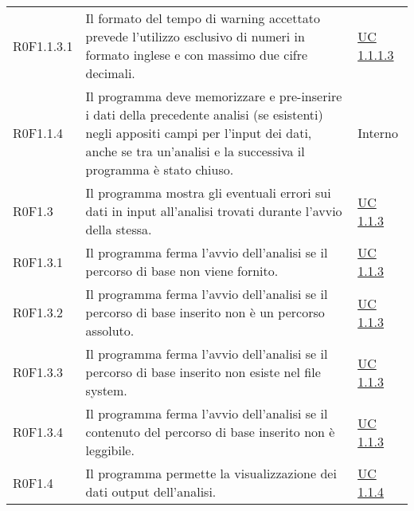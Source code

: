 \begin{center}
\begin{longtable}{p{4.2cm}!{\color{white}\vrule width 0.5mm}p{6cm}!{\color{white}\vrule width 0.5mm}p{2.5cm}!{\color{white}\vrule width 0.5mm}}
				\hspace{6mm}\hypertarget{R0F1.1.3.1}{R0F1.1.3.1}  & Il formato del tempo di warning accettato prevede l'utilizzo esclusivo di numeri in formato inglese e con massimo due cifre decimali. & \hyperref[subsec:UC1.1.1.3]{UC 1.1.1.3}\\
				
				
				\hspace{4mm}\hypertarget{R0F1.1.4}{R0F1.1.4}  & Il programma deve memorizzare e pre-inserire i dati della precedente analisi (se esistenti) negli appositi campi per l'input dei dati, anche se tra un'analisi e la successiva il programma è stato chiuso. & Interno\\
				
				
				\hspace{2mm}\hypertarget{R0F1.3}{R0F1.3} & Il programma mostra gli eventuali errori sui dati in input all'analisi trovati durante l'avvio della stessa. & \hyperref[subsec:UC1.1.3]{UC 1.1.3}\\
				
				\hspace{4mm}\hypertarget{R0F1.3.1}{R0F1.3.1} & Il programma ferma l'avvio dell'analisi se il percorso di base non viene fornito. & \hyperref[subsec:UC1.1.3]{UC 1.1.3}\\
				
				\hspace{4mm}\hypertarget{R0F1.3.2}{R0F1.3.2} & Il programma ferma l'avvio dell'analisi se il percorso di base inserito non è un percorso assoluto. & \hyperref[subsec:UC1.1.3]{UC 1.1.3}\\
				
				\hspace{4mm}\hypertarget{R0F1.3.3}{R0F1.3.3} & Il programma ferma l'avvio dell'analisi se il percorso di base inserito non esiste nel file system. & \hyperref[subsec:UC1.1.3]{UC 1.1.3}\\
				
				\hspace{4mm}\hypertarget{R0F1.3.4}{R0F1.3.4} & Il programma ferma l'avvio dell'analisi se il contenuto del percorso di base inserito non è leggibile. & \hyperref[subsec:UC1.1.3]{UC 1.1.3}\\
				
				
				\hspace{2mm}\hypertarget{R0F1.4}{R0F1.4} & Il programma permette la visualizzazione dei dati output dell'analisi. & \hyperref[subsec:UC1.1.4]{UC 1.1.4}\\
				

\end{longtable}
\end{center}
